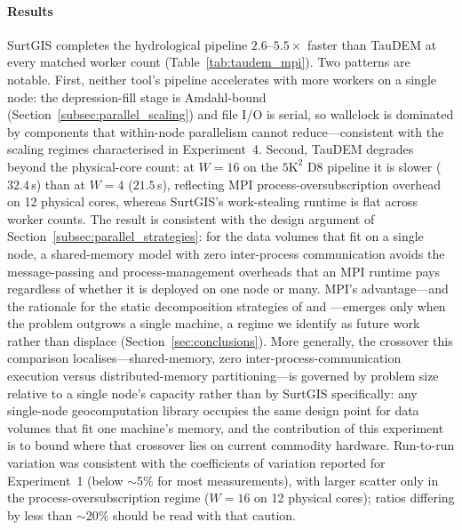 \documentclass[preprint,review,12pt,authoryear]{elsarticle}
\newif\ifmarkedrev
\newcommand{\revtext}[1]{\ifmarkedrev\textcolor{blue}{#1}\else#1\fi}
\begin{document}
\paragraph{\revtext{Results}} \revtext{SurtGIS completes the hydrological pipeline $2.6$--$5.5\times$ faster than TauDEM at every matched worker count (Table~\ref{tab:taudem_mpi}). Two patterns are notable. First, neither tool's pipeline accelerates with more workers on a single node: the depression-fill stage is Amdahl-bound (Section~\ref{subsec:parallel_scaling}) and file I/O is serial, so wallclock is dominated by components that within-node parallelism cannot reduce---consistent with the scaling regimes characterised in Experiment~4. Second, TauDEM degrades beyond the physical-core count: at $W=16$ on the $5\text{K}^2$ D8 pipeline it is slower ($32.4$\,s) than at $W=4$ ($21.5$\,s), reflecting MPI process-oversubscription overhead on 12 physical cores, whereas SurtGIS's work-stealing runtime is flat across worker counts. The result is consistent with the design argument of Section~\ref{subsec:parallel_strategies}: for the data volumes that fit on a single node, a shared-memory model with zero inter-process communication avoids the message-passing and process-management overheads that an MPI runtime pays regardless of whether it is deployed on one node or many. MPI's advantage---and the rationale for the static decomposition strategies of \citet{qin2014strategy} and \citet{wang2021loadbalancing}---emerges only when the problem outgrows a single machine, a regime we identify as future work rather than displace (Section~\ref{sec:conclusions}). More generally, the crossover this comparison localises---shared-memory, zero inter-process-communication execution versus distributed-memory partitioning---is governed by problem size relative to a single node's capacity rather than by SurtGIS specifically: any single-node geocomputation library occupies the same design point for data volumes that fit one machine's memory, and the contribution of this experiment is to bound where that crossover lies on current commodity hardware. Run-to-run variation was consistent with the coefficients of variation reported for Experiment~1 (below $\sim$5\% for most measurements), with larger scatter only in the process-oversubscription regime ($W=16$ on 12 physical cores); ratios differing by less than $\sim$20\% should be read with that caution.}
\end{document}
